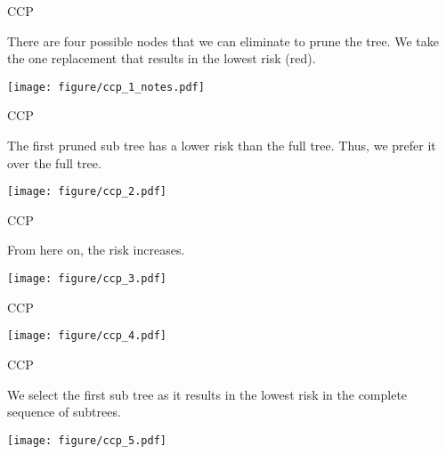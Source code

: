 \documentclass[11pt,compress,t,notes=noshow, xcolor=table]{beamer}
\begin{document}
\begin{frame}[noframenumbering]{CCP}

There are four possible nodes that we can eliminate to prune the tree.
We take the one replacement that results in the lowest risk (red).

\vspace{0.25cm}

\color{fgcolor}

{\centering \texttt{[image: figure/ccp\_1\_notes.pdf]} 

}

\end{frame}

\begin{frame}[noframenumbering]{CCP}


The first pruned sub tree has a lower risk than the full tree.
Thus, we prefer it over the full tree.
\vspace{0.25cm}

{\centering \texttt{[image: figure/ccp\_2.pdf]} 

}

\end{frame}

\begin{frame}[noframenumbering]{CCP}

From here on, the risk increases.
\vspace{0.25cm}


{\centering \texttt{[image: figure/ccp\_3.pdf]} 

}

\end{frame}

\begin{frame}[noframenumbering]{CCP}


{\centering \texttt{[image: figure/ccp\_4.pdf]} 

}


\end{frame}

\begin{frame}[noframenumbering]{CCP}

We select the first sub tree as it results in the lowest risk in the complete sequence of subtrees.
\vspace{0.25cm}


{\centering \texttt{[image: figure/ccp\_5.pdf]} 

}


\end{frame}



\endlecture
\end{document}

